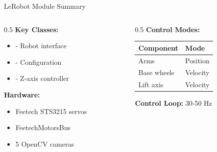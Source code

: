 \begin{frame}{LeRobot Module Summary}
\begin{columns}
\begin{column}{0.5\textwidth}
    \textbf{Key Classes:}
    \begin{itemize}
        \item {} - Robot interface
        \item {} - Configuration
        \item {} - Z-axis controller
    \end{itemize}

    \vspace{0.3cm}

    \textbf{Hardware:}
    \begin{itemize}
        \item Feetech STS3215 servos
        \item FeetechMotorsBus
        \item 5 OpenCV cameras
    \end{itemize}
\end{column}
\begin{column}{0.5\textwidth}
    \textbf{Control Modes:}
    \begin{table}
    \centering
    \footnotesize
    \begin{tabular}{ll}
    \toprule
    \textbf{Component} & \textbf{Mode} \\
    \midrule
    Arms & Position \\
    Base wheels & Velocity \\
    Lift axis & Velocity \\
    \bottomrule
    \end{tabular}
    \end{table}

    \vspace{0.3cm}

    \textbf{Control Loop:} 30-50 Hz
\end{column}
\end{columns}
\end{frame}

